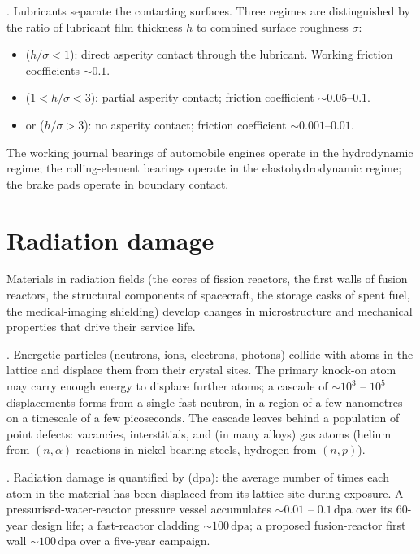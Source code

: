 . Lubricants separate the contacting surfaces.
Three regimes are distinguished by the ratio of lubricant film
thickness $h$ to combined surface roughness $\sigma$:

\begin{itemize}[leftmargin=*]
\item {} ($h/\sigma < 1$): direct asperity
  contact through the lubricant. Working friction coefficients
  $\sim 0.1$.
\item {} ($1 < h/\sigma < 3$): partial
  asperity contact; friction coefficient $\sim 0.05$--$0.1$.
\item {} or  ($h/\sigma > 3$): no asperity contact; friction
  coefficient $\sim 0.001$--$0.01$.
\end{itemize}

The working journal bearings of automobile engines operate in the
hydrodynamic regime; the rolling-element bearings operate in the
elastohydrodynamic regime; the brake pads operate in boundary
contact.

\section{Radiation damage}

Materials in radiation fields (the cores of fission reactors, the
first walls of fusion reactors, the structural components of
spacecraft, the storage casks of spent fuel, the medical-imaging
shielding) develop changes in microstructure and mechanical properties
that drive their service life.

. Energetic particles (neutrons, ions, electrons,
photons) collide with atoms in the lattice and displace them from
their crystal sites. The primary knock-on atom may carry enough
energy to displace further atoms; a cascade of $\sim 10^3$ -- $10^5$
displacements forms from a single fast neutron, in a region of a few
nanometres on a timescale of a few picoseconds. The cascade leaves
behind a population of point defects: vacancies, interstitials,
and (in many alloys) gas atoms (helium from $(n,\alpha)$ reactions
in nickel-bearing steels, hydrogen from $(n,p)$).

. Radiation damage is quantified by
 (dpa): the average number of times
each atom in the material has been displaced from its lattice site
during exposure. A pressurised-water-reactor pressure vessel
accumulates $\sim 0.01$ -- $0.1\,\text{dpa}$ over its $60$-year
design life; a fast-reactor cladding $\sim 100\,\text{dpa}$; a
proposed fusion-reactor first wall $\sim 100\,\text{dpa}$ over a
five-year campaign.

